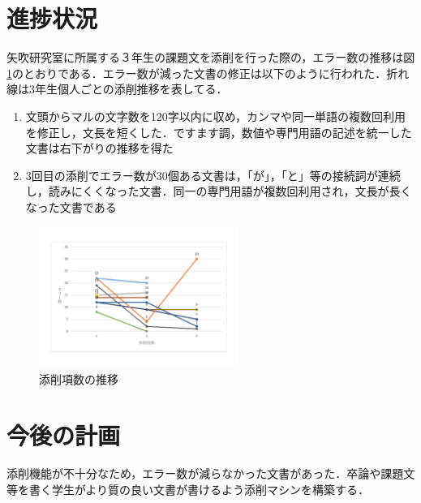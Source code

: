 \documentclass[uplatex,twocolumn,dvipdfmx]{jsarticle}
\begin{document}
\section{進捗状況}
矢吹研究室に所属する３年生の課題文を添削を行った際の，エラー数の推移は図\ref{conf}のとおりである．エラー数が減った文書の修正は以下のように行われた．折れ線は3年生個人ごとの添削推移を表してる．

\begin{enumerate}
 \item 文頭からマルの文字数を120字以内に収め，カンマや同一単語の複数回利用を修正し，文長を短くした．ですます調，数値や専門用語の記述を統一した文書は右下がりの推移を得た
 \item 3回目の添削でエラー数が30個ある文書は，「が」，「と」等の接続詞が連続し，読みにくくなった文書．同一の専門用語が複数回利用され，文長が長くなった文書である
\end{enumerate}

\begin{figure}[h]
\centering
\includegraphics[width=6.5cm,clip]{redpen.pdf}
\caption{添削項数の推移}\label{conf}
\end{figure}

\section{今後の計画}
添削機能が不十分なため，エラー数が減らなかった文書があった．卒論や課題文等を書く学生がより質の良い文書が書けるよう添削マシンを構築する．


\end{document}
